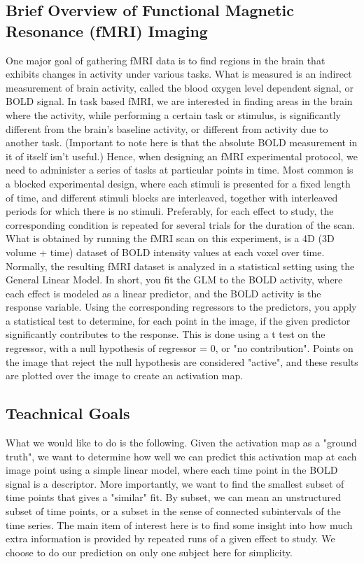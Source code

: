 \documentclass{report}
\begin{document}
\subsection{Brief Overview of Functional Magnetic Resonance (fMRI) Imaging}
One major goal of gathering fMRI data is to find regions in the brain that exhibits changes in activity under various tasks.  What is measured is an indirect measurement of brain activity, called the blood oxygen level dependent signal, or BOLD signal.  In task based fMRI, we are interested in finding areas in the brain where the activity, while performing a certain task or stimulus, is significantly different from the brain's baseline activity, or different from activity due to another task. (Important to note here is that the absolute BOLD measurement in it of itself isn't useful.) Hence, when designing an fMRI experimental protocol, we need to administer a series of tasks at particular points in time.  Most common is a blocked experimental design, where each stimuli is presented for a fixed length of time, and different stimuli blocks are interleaved, together with interleaved periods for which there is no stimuli.  Preferably, for each effect to study, the corresponding condition is repeated for several trials for the duration of the scan. What is obtained by running the fMRI scan on this experiment, is a 4D (3D volume + time) dataset of BOLD intensity values at each voxel over time.
Normally, the resulting fMRI dataset is analyzed in a statistical setting using the General Linear Model. In short, you fit the GLM to the BOLD activity, where each effect is modeled as a linear predictor, and the BOLD activity is the response variable.  Using the corresponding regressors to the predictors, you apply a statistical test to determine, for each point in the image, if the given predictor significantly contributes to the response.  This is done using a t test on the regressor, with a null hypothesis of regressor = 0, or "no contribution".  Points on the image that reject the null hypothesis are considered "active", and these results are plotted over the image to create an activation map.
\subsection{Teachnical Goals}
What we would like to do is the following.  Given the activation map as a "ground truth", we want to determine how well we can predict this activation map at each image point using a simple linear model, where each time point in the BOLD signal is a descriptor. More importantly, we want to find the smallest subset of time points that gives a "similar" fit. By subset, we can mean an unstructured subset of time points, or a subset in the sense of connected subintervals of the time series. The main item of interest here is to find some insight into how much extra information is provided by repeated runs of a given effect to study. We choose to do our prediction on only one subject here for simplicity.
\end{document}
